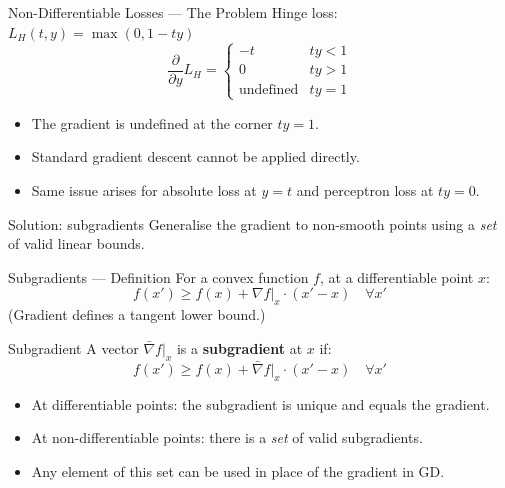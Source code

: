 \begin{frame}{Non-Differentiable Losses — The Problem}
  Hinge loss: $L_H(t,y)=\max(0,1-ty)$
  \[
    \frac{\partial}{\partial y}L_H = \begin{cases}
      -t & ty<1\\ 0 & ty>1\\ \text{undefined} & ty=1
    \end{cases}
  \]
  \begin{itemize}
    \item The gradient is \textcolor{AlertRed}{undefined} at the corner $ty=1$.
    \item Standard gradient descent cannot be applied directly.
    \item Same issue arises for absolute loss at $y=t$ and perceptron loss at $ty=0$.
  \end{itemize}
  \begin{block}{Solution: subgradients}
    Generalise the gradient to non-smooth points using a \emph{set} of valid linear bounds.
  \end{block}
\end{frame}

\begin{frame}{Subgradients — Definition}
  For a convex function $f$, at a differentiable point $x$:
  \[
    f(x')\geq f(x)+\nabla f|_x\cdot(x'-x)\quad\forall x'
  \]
  (Gradient defines a tangent lower bound.)
  \begin{block}{Subgradient}
    A vector $\bar\nabla f|_x$ is a \textbf{subgradient} at $x$ if:
    \[
      f(x')\geq f(x)+\bar\nabla f|_x\cdot(x'-x)\quad\forall x'
    \]
  \end{block}
  \begin{itemize}
    \item At differentiable points: the subgradient is unique and equals the gradient.
    \item At non-differentiable points: there is a \emph{set} of valid subgradients.
    \item Any element of this set can be used in place of the gradient in GD.
  \end{itemize}
\end{frame}

